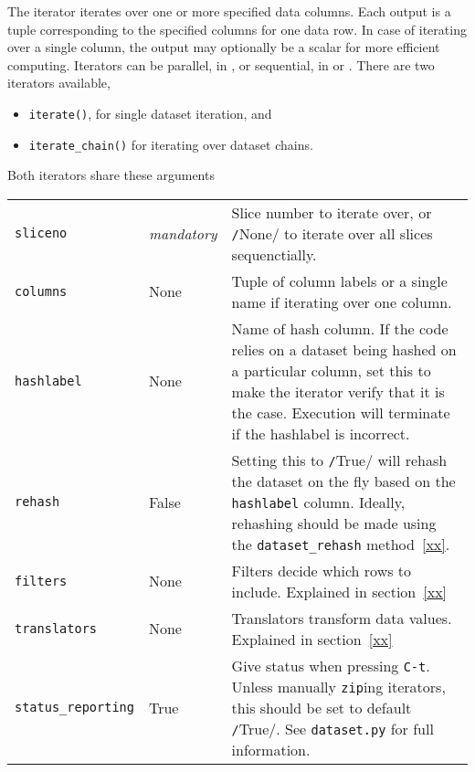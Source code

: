 The iterator iterates over one or more specified data columns.  Each
output is a tuple corresponding to the specified columns for one data
row.  In case of iterating over a single column, the output may
optionally be a scalar for more efficient computing.  Iterators can be
parallel, in \analysis, or sequential, in \prepare or \synthesis.
There are two iterators available,
\begin{itemize}
\item [] \texttt{iterate()}, for  single dataset iteration, and
\item [] \texttt{iterate\_chain()} for iterating over dataset chains.
\end{itemize}
Both iterators share these arguments
\begin{snugshade}
\begin{tabular}{llp{6cm}}

  \texttt{sliceno} & \textsl{mandatory} & Slice number to iterate
  over, or \texttt/None/ to iterate over all slices
  sequenctially. \\

  \texttt{columns} & None & Tuple of column labels or a single name if
  iterating over one column.\\

  \texttt{hashlabel} & None & Name of hash column.  If the code relies
  on a dataset being hashed on a particular column, set this to make
  the iterator verify that it is the case.  Execution will terminate
  if the hashlabel is incorrect.\\

  \texttt{rehash} & False & Setting this to \texttt/True/
  will rehash the dataset on the fly based on the \texttt{hashlabel}
  column.  Ideally, rehashing should be made using the
  \texttt{dataset\_rehash} method~\ref{xx}.\\
  
  \texttt{filters} & None & Filters decide which rows to include.
  Explained in section~\ref{xx}\\

  \texttt{translators} & None & Translators transform data values.
  Explained in section~\ref{xx}\\
  
  \texttt{status\_reporting} & True & Give status when pressing
  \texttt{C-t}.  Unless manually \texttt{zip}ing iterators, this
  should be set to default \texttt/True/.  See
  \texttt{dataset.py} for full information.\\
\end{tabular}
\end{snugshade}
